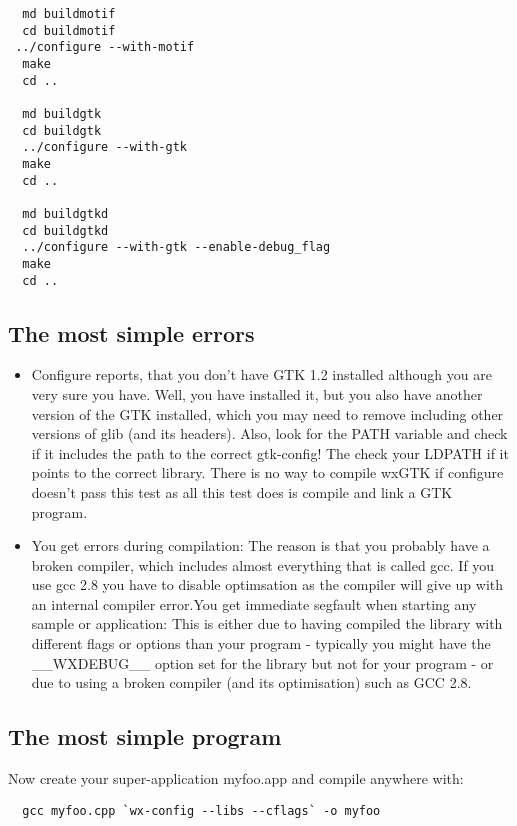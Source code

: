 \begin{verbatim}
  md buildmotif
  cd buildmotif
 ../configure --with-motif
  make
  cd ..

  md buildgtk
  cd buildgtk
  ../configure --with-gtk
  make
  cd ..

  md buildgtkd
  cd buildgtkd
  ../configure --with-gtk --enable-debug_flag
  make
  cd ..
\end{verbatim}

\subsection{The most simple errors}

\begin{itemize}\itemsep=0pt
\item Configure reports, that you don't have GTK 1.2 installed although you are 
very sure you have. Well, you have installed it, but you also have another 
version of the GTK installed, which you may need to remove including other 
versions of glib (and its headers). Also, look for the PATH variable and check 
if it includes the path to the correct gtk-config! The check your LDPATH if it 
points to the correct library. There is no way to compile wxGTK if configure 
doesn't pass this test as all this test does is compile and link a GTK program.
\item You get errors during compilation: The reason is that you probably have a broken 
compiler, which includes almost everything that is called gcc. If you use gcc 2.8 
you have to disable optimsation as the compiler will give up with an internal 
compiler error.You get immediate segfault when starting any sample or application: This is either 
due to having compiled the library with different flags or options than your program - 
typically you might have the __WXDEBUG__ option set for the library but not for your 
program - or due to using a broken compiler (and its optimisation) such as GCC 2.8.
\end{itemize}

\subsection{The most simple program}

Now create your super-application myfoo.app and compile anywhere with:

\begin{verbatim}
  gcc myfoo.cpp `wx-config --libs --cflags` -o myfoo
\end{verbatim}

